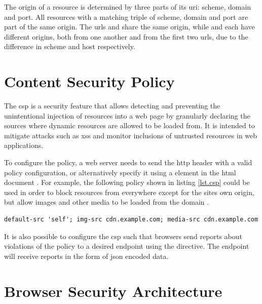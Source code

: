 The origin of a resource is determined by three parts of its \ac{uri}: scheme, domain and port. All resources with a matching triple of scheme, domain and port are part of the same origin. \cite{origin} The \acp{url}  and  share the same origin, while  and  each have different origins, both from one another and from the first two \acp{url}, due to the difference in scheme and host respectively.



\section{Content Security Policy}
\label{sec.csp}

The \acf{csp} is a security feature that allows detecting and preventing the unintentional injection of resources into a web page by granularly declaring the sources where dynamic resources are allowed to be loaded from. It is intended to mitigate attacks such as \acf{xss} and monitor inclusions of untrusted resources in web applications. \cite{MozCSP}

To configure the policy, a web server needs to send the  \acs{http} header with a valid policy configuration, or alternatively specify it using a  element in the \acs{html} document \cite{MozCSP}. For example, the following policy shown in listing \ref{lst.csp} could be used in order to block resources from everywhere except for the sites own origin, but allow images and other media to be loaded from the domain .

\begin{lstlisting}[language=CSP,numbers=none,label={lst.csp},caption={Example of a valid CSP policy}]
default-src 'self'; img-src cdn.example.com; media-src cdn.example.com
\end{lstlisting}

It is also possible to configure the \ac{csp} such that browsers send reports about violations of the policy to a desired endpoint using the  directive. The endpoint will receive reports in the form of \acs{json} encoded data. \cite{MozCSP}



\section{Browser Security Architecture}
\label{sec.browser-security-architecture}

